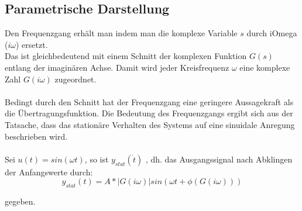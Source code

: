 \subsection{Parametrische Darstellung}
Den Frequenzgang erhält man indem man die komplexe Variable $s$ durch iOmega ($i\omega$) ersetzt. \\
Das ist gleichbedeutend mit einem Schnitt der komplexen Funktion $G(s)$ entlang der imaginären Achse.
Damit wird jeder Kreisfrequenz $\omega$ eine komplexe Zahl $G(i\omega)$ zugeordnet. 
\\
\\
Bedingt durch den Schnitt hat der Frequenzgang eine geringere Aussagekraft als die Übertragungsfunktion. 
Die Bedeutung des Frequenzgangs ergibt sich aus der Tatsache, dass das stationäre Verhalten des Systems auf eine sinuidale Anregung beschrieben wird.\\
\\

Sei $u(t) = sin(\omega t)$, so ist $y_{stat}(\dot{t})$ %
, dh. das Ausgangssignal nach Abklingen der Anfangswerte durch:
\begin{equation*}
    y_{stat}(t)=A*|G(i\omega )|sin(\omega t + \phi (G(i\omega )))
\end{equation*}

gegeben. %
